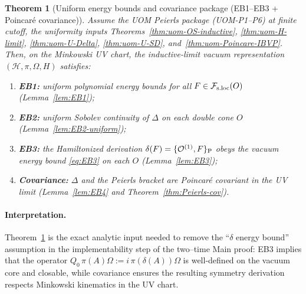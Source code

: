 \documentclass[10pt]{article}
\newcommand{\Fsloc}{\mathcal F_{\rm s.loc}}
\theoremstyle{definition}
\theoremstyle{plain}
\newtheorem{theorem}{Theorem}[section]
\begin{document}

\begin{theorem}[Uniform energy bounds and covariance package (EB1--EB3 + Poincar\'e covariance)]
\label{thm:EB-package}
Assume the UOM Peierls package (UOM-P1--P6) at finite cutoff, the uniformity inputs
Theorems~\ref{thm:uom-OS-inductive}, \ref{thm:uom-H-limit}, \ref{thm:uom-U-Delta}, \ref{thm:uom-U-SD}, and~\ref{thm:uom-Poincare-IBVP}.  Then, on the Minkowski UV chart, the inductive-limit
vacuum representation $(\mathcal H,\pi,\Omega,H)$ satisfies:
\begin{enumerate}[label=\textnormal{(\roman*)},leftmargin=2.2em,itemsep=1pt]
\item \textbf{EB1:} uniform polynomial energy bounds for all $F\in\Fsloc(O)$ (Lemma~\ref{lem:EB1});
\item \textbf{EB2:} uniform Sobolev continuity of $\Delta$ on each double cone $O$ (Lemma~\ref{lem:EB2-uniform});
\item \textbf{EB3:} the Hamiltonized derivation $\delta(F)=\{\mathcal O^{(1)},F\}_{\rm P}$ obeys the vacuum
energy bound \eqref{eq:EB3} on each $O$ (Lemma~\ref{lem:EB3});
\item \textbf{Covariance:} $\Delta$ and the Peierls bracket are Poincar\'e covariant in the UV limit
(Lemma~\ref{lem:EB4} and Theorem~\ref{thm:Peierls-cov}).
\end{enumerate}
\end{theorem}

\paragraph{Interpretation.}
Theorem~\ref{thm:EB-package} is the exact analytic input needed to remove the ``$\delta$ energy bound''
assumption in the implementability step of the two--time Main proof: EB3 implies that the operator
$Q_0\,\pi(A)\Omega:=i\,\pi(\delta(A))\Omega$ is well-defined on the vacuum core and closable, while covariance
ensures the resulting symmetry derivation respects Minkowski kinematics in the UV chart.
\end{document}
